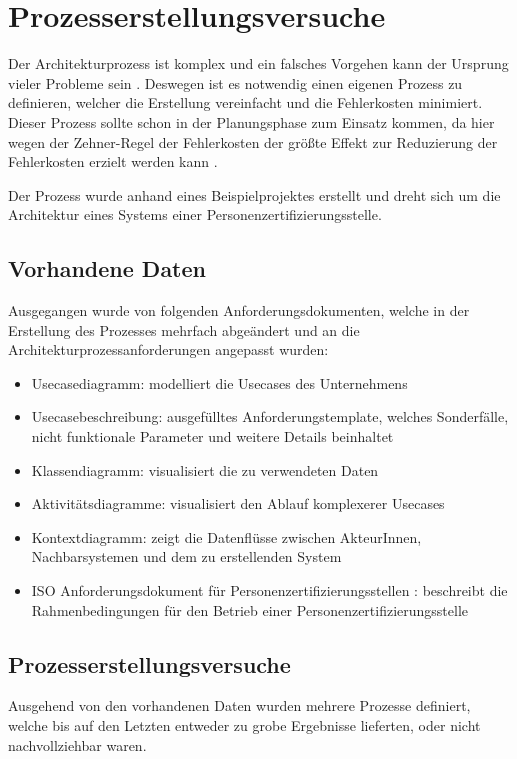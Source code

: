 \chapter{Prozesserstellungsversuche}
Der Architekturprozess ist komplex und ein falsches Vorgehen kann der Ursprung vieler Probleme sein \cite[S. 7-8]{softarch}. Deswegen ist es notwendig einen eigenen Prozess zu definieren, welcher die Erstellung vereinfacht und die Fehlerkosten minimiert. Dieser Prozess sollte schon in der Planungsphase zum Einsatz kommen, da hier wegen der Zehner-Regel der Fehlerkosten der größte Effekt zur Reduzierung der Fehlerkosten erzielt werden kann \cite[S. 154]{fehler}.

Der Prozess wurde anhand eines Beispielprojektes erstellt und dreht sich um die Architektur eines Systems einer Personenzertifizierungsstelle.

\section{Vorhandene Daten}
Ausgegangen wurde von folgenden Anforderungsdokumenten, welche in der Erstellung des Prozesses mehrfach abgeändert und an die Architekturprozessanforderungen angepasst wurden:

\begin{itemize}
  \item Usecasediagramm: modelliert die Usecases des Unternehmens
  \item Usecasebeschreibung: ausgefülltes Anforderungstemplate, welches Sonderfälle, nicht funktionale Parameter und weitere Details beinhaltet
  \item Klassendiagramm: visualisiert die zu verwendeten Daten
  \item Aktivitätsdiagramme: visualisiert den Ablauf komplexerer Usecases
  \item Kontextdiagramm: zeigt die Datenflüsse zwischen AkteurInnen, Nachbarsystemen und dem zu erstellenden System
  \item ISO Anforderungsdokument für Personenzertifizierungsstellen \cite{ISO_CERT}: beschreibt die Rahmenbedingungen für den Betrieb einer Personenzertifizierungsstelle
\end{itemize}

\section{Prozesserstellungsversuche}
Ausgehend von den vorhandenen Daten wurden mehrere Prozesse definiert, welche bis auf den Letzten entweder zu grobe Ergebnisse lieferten, oder nicht nachvollziehbar waren.

